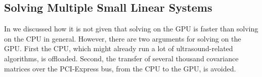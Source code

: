 
\subsection{Solving Multiple Small Linear Systems}

In \cite{Asen2012} we discussed how it is not given that solving on the GPU is faster than solving on the CPU in general. However, there are two arguments for solving on the GPU. First the CPU, which might already run a lot of ultrasound-related algorithms, is offloaded. Second, the transfer of several thousand covariance matrices over the PCI-Express bus, from the CPU to the GPU, is avoided.

